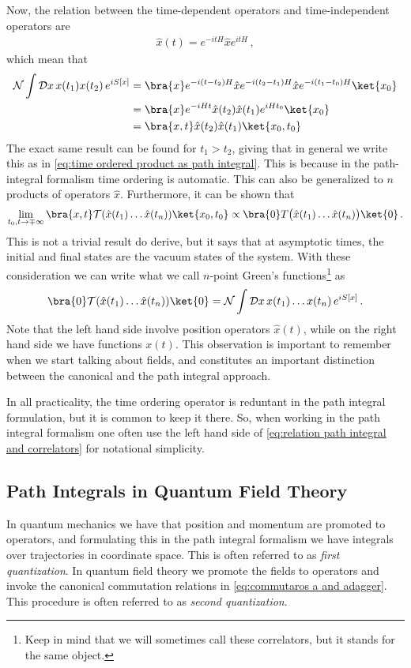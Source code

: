 Now, the relation between the time-dependent operators and time-independent operators are
\begin{align}
    \hat{x}(t)=e^{-itH}\hat{x}e^{itH}\,,
\end{align}
which mean that
\begin{align}
    \mathcal{N}\int\mathcal{D}x \,x(t_1)x(t_2)\,e^{iS[x]}&=\bra{x}e^{-i(t-t_2)H}\hat{x}e^{-i(t_2-t_1)H}\hat{x}e^{-i(t_1-t_0)H}\ket{x_0}\nonumber
    \\
    &=\bra{x}e^{-iHt}\hat{x}(t_2)\hat{x}(t_1)e^{iHt_0}\ket{x_0}\nonumber
    \\
    &=\bra{x,t}\hat{x}(t_2)\hat{x}(t_1)\ket{x_0,t_0}
\end{align}
The exact same result can be found for $t_1>t_2$, giving that in general we write this as in \cref{eq:time ordered product as path integral}. This is because in the path-integral formalism time ordering is automatic. This can also be generalized to $n$ products of operators $\hat{x}$. Furthermore, it can be shown that 
\begin{align}
    \lim_{t_{0},t\to\mp\infty}\bra{x,t}\mathcal{T}(\hat{x}(t_1)\dots\hat{x}(t_n))\ket{x_0,t_0}\propto\bra{0}T\big(\hat{x}(t_1)\dots\hat{x}(t_n)\big)\ket{0}\,.
\end{align}
This is not a trivial result do derive, but it says that at asymptotic times, the initial and final states are the vacuum states of the system. With these consideration we can write what we call $n$-point Green's functions\footnote{Keep in mind that we will sometimes call these correlators, but it stands for the same object.} as
\begin{align}\label{eq:relation path integral and correlators}
     \bra{0}\mathcal{T}(\hat{x}(t_1)\dots\hat{x}(t_n))\ket{0}=\mathcal{N}\int\mathcal{D}x \,x(t_1)\dots x(t_n)\,e^{iS[x]}\,.
\end{align}
Note that the left hand side involve position operators $\hat{x}(t)$, while on the right hand side we have functions $x(t)$. This observation is important to remember when we start talking about fields, and constitutes an important distinction between the canonical and the path integral approach.

In all practicality, the time ordering operator is reduntant in the path integral formulation, but it is common to keep it there. So, when working in the path integral formalism one often use the left hand side of \cref{eq:relation path integral and correlators} for notational simplicity.

\subsection{Path Integrals in Quantum Field Theory}\label{sec:Path I in QFT}
In quantum mechanics we have that position and momentum are promoted to operators, and formulating this in the path integral formalism we have integrals over trajectories in coordinate space. This is often referred to as \emph{first quantization}. In quantum field theory we promote the fields to operators and invoke the canonical commutation relations in \cref{eq:commutaros a and adagger}. This procedure is often referred to as \emph{second quantization}. 

